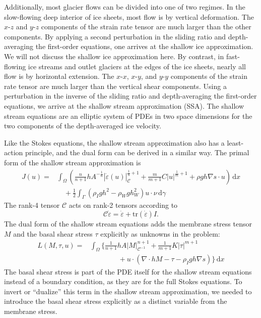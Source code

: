\documentclass{article}
\theoremstyle{definition}
\theoremstyle{plain}
\newcommand{\ud}{\hspace{2pt}\mathrm{d}}
\begin{document}
Additionally, most glacier flows can be divided into one of two regimes.
In the slow-flowing deep interior of ice sheets, most flow is by vertical deformation.
The $x$-$z$ and $y$-$z$ components of the strain rate tensor are much larger than the other components.
By applying a second perturbation in the sliding ratio and depth-averaging the first-order equations, one arrives at the shallow ice approximation.
We will not discuss the shallow ice approximation here.
By contrast, in fast-flowing ice streams and outlet glaciers at the edges of the ice sheets, nearly all flow is by horizontal extension.
The $x$-$x$, $x$-$y$, and $y$-$y$ components of the strain rate tensor are much larger than the vertical shear components.
Using a perturbation in the inverse of the sliding ratio and depth-averaging the first-order equations, we arrive at the shallow stream approximation (SSA).
The shallow stream equations are an elliptic system of PDEs in two space dimensions for the two components of the depth-averaged ice velocity.

Like the Stokes equations, the shallow stream approximation also has a least-action principle, and the dual form can be derived in a similar way.
The primal form of the shallow stream approximation is
\begin{align}
    J(u) = & \int_\Omega\left(\frac{n}{n + 1}hA^{-\frac{1}{n}}|\dot\varepsilon(u)|_{\mathscr{C}}^{\frac{1}{n} + 1} + \frac{m}{m + 1}C|u|^{\frac{1}{m} + 1} + \rho gh\nabla s\cdot u\right)\ud x \nonumber \\
    & \quad + \frac{1}{2}\int_\Gamma\left(\rho_Igh^2 - \rho_Wgh_W^2\right)u\cdot\nu\ud\gamma
\end{align}
The rank-4 tensor $\mathscr{C}$ acts on rank-2 tensors according to
\begin{equation}
    \mathscr{C}\dot\varepsilon = \dot\varepsilon + \text{tr}(\dot\varepsilon)I.
\end{equation}
The dual form of the shallow stream equations adds the membrane stress tensor $M$ and the basal shear stress $\tau$ explicitly as unknowns in the problem:
\begin{align}
    L(M, \tau, u) = & \int_\Omega\Bigg\{\frac{1}{n + 1}hA|M|_{\mathscr{C}^{-1}}^{n + 1} + \frac{1}{m + 1}K|\tau|^{m + 1} \nonumber\\
    & \qquad\qquad + u\cdot\left(\nabla\cdot hM - \tau - \rho_Igh\nabla s\right)\Bigg\}\ud x
\end{align}
The basal shear stress is part of the PDE itself for the shallow stream equations instead of a boundary condition, as they are for the full Stokes equations.
To invert or ``dualize'' this term in the shallow stream approximation, we needed to introduce the basal shear stress explicitly as a distinct variable from the membrane stress.
\end{document}
